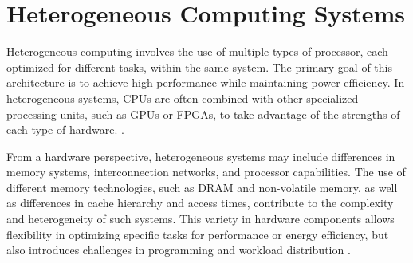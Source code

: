 


\section{Heterogeneous Computing Systems}
Heterogeneous computing involves the use of multiple types of processor, each optimized for different tasks, within the same system. The primary goal of this architecture is to achieve high performance while maintaining power efficiency. In heterogeneous systems, CPUs are often combined with other specialized processing units, such as GPUs or FPGAs, to take advantage of the strengths of each type of hardware. \cite{Zahran2019}.

From a hardware perspective, heterogeneous systems may include differences in memory systems, interconnection networks, and processor capabilities. The use of different memory technologies, such as DRAM and non-volatile memory, as well as differences in cache hierarchy and access times, contribute to the complexity and heterogeneity of such systems. This variety in hardware components allows flexibility in optimizing specific tasks for performance or energy efficiency, but also introduces challenges in programming and workload distribution \cite{Zahran2019}.

